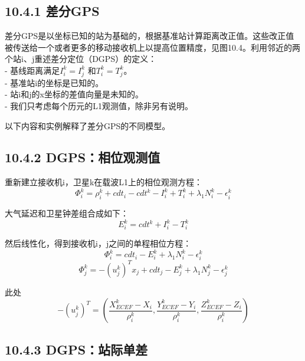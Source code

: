 \subsection{10.4.1 差分GPS}

差分GPS是以坐标已知的站为基础的，根据基准站计算距离改正值。这些改正值被传送给一个或者更多的移动接收机上以提高位置精度，见图10.4。利用邻近的两个站i、j重述差分定位（DGPS）的定义：\\
- 基线距离满足$I_{i}^{k}=I_{j}^{k}$ 和$T_{i}^{k}=T_{j}^{k}$。\\
- 基准站i的坐标是已知的。\\
- 站i和j的x坐标的差值向量是未知的。\\
- 我们只考虑每个历元的L1观测值，除非另有说明。

以下内容和实例解释了差分GPS的不同模型。

\subsection{10.4.2 DGPS：相位观测值}

重新建立接收机i，卫星k在载波L1上的相位观测方程：
\begin{equation}
	\Phi_{i}^{k}=\rho_{i}^{k}+cdt_{i}-cdt^{k}-I_{i}^{k}+T_{i}^{k}+\lambda_{1}N_{i}^{k}-\epsilon_{i}^{k}
\end{equation}

大气延迟和卫星钟差组合成如下：
\begin{equation}
	E_{i}^{k}=cdt^{k}+I_{i}^{k}-T_{i}^{k}
\end{equation}

然后线性化，得到接收机i，j之间的单程相位方程：
$$
\Phi_{i}^{k}= cdt_{i}-E_{i}^{k}+\lambda_{1}N_{i}^{k}-\epsilon_{i}^{k}
$$
$$
\Phi_{j}^{k}= -(u_{j}^{k})^{T}x_{j}+cdt_{j}-E_{j}^{k}+\lambda_{1}N_{j}^{k}-\epsilon_{j}^{k}
$$

此处
\begin{equation}
	-(u_{j}^{k})^{T}=(\frac{X_{ECEF}^{k}-X_{i}}{\rho_{i}^{k}},\frac{Y_{ECEF}^{k}-Y_{i}}{\rho_{i}^{k}},\frac{Z_{ECEF}^{k}-Z_{i}}{\rho_{i}^{k}})
\end{equation}

\subsection{10.4.3 DGPS：站际单差}

